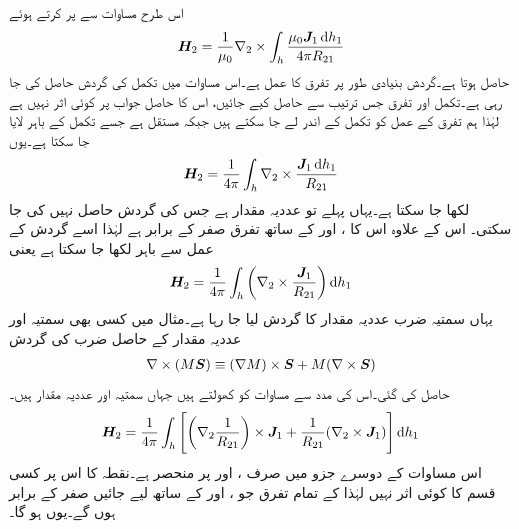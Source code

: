 اس طرح مساوات  سے  پر کرتے ہوئے
\begin{align*}
\kvec{H}_2=\frac{1}{\mu_0} \nabla_2 \times \int_h \frac{\mu_0 \kvec{J}_1 \dif h_1}{4\pi R_{21}}
\end{align*}
حاصل ہوتا ہے۔گردش  بنیادی طور پر تفرق کا عمل ہے۔اس مساوات میں تکمل کی گردش حاصل کی جا رہی ہے۔تکمل اور تفرق جس ترتیب سے حاصل کیے جائیں، اس کا حاصل جواب پر کوئی اثر نہیں ہے لہٰذا ہم تفرق کے عمل کو تکمل کے اندر لے جا سکتے ہیں جبکہ  مستقل ہے جسے تکمل کے باہر لایا جا سکتا ہے۔یوں
\begin{align*}
\kvec{H}_2=\frac{1}{4\pi}  \int_h \nabla_2 \times\frac{ \kvec{J}_1 \dif h_1}{ R_{21}}
\end{align*}
لکھا جا سکتا ہے۔یہاں  پہلے تو عددیہ مقدار ہے جس کی گردش حاصل نہیں کی جا سکتی۔ اس کے علاوہ اس کا ،  اور  کے ساتھ تفرق صفر کے برابر ہے لہٰذا اسے گردش کے عمل سے  باہر لکھا جا سکتا ہے یعنی
\begin{align}\label{مساوات_مقناطیسی_گردش_ثبوت_الف}
\kvec{H}_2=\frac{1}{4\pi}  \int_h \left(\nabla_2 \times\frac{ \kvec{J}_1}{ R_{21}}\right) \dif h_1
\end{align}
یہاں سمتیہ  ضرب عددیہ مقدار  کا گردش لیا جا رہا ہے۔مثال  میں کسی بھی سمتیہ  اور عددیہ مقدار  کے حاصل ضرب کی گردش
\begin{align}
\nabla \times (M {{\boldsymbol{S}}}) \equiv (\nabla M) \times {\ensuremath{{\boldsymbol{S}}}} +M(\nabla \times {\ensuremath{{\boldsymbol{S}}}})
\end{align}
حاصل کی گئی۔اس کی مدد سے مساوات  کو کھولتے ہیں جہاں سمتیہ  اور عددیہ مقدار  ہیں۔
\begin{align}\label{مساوات_مقناطیسی_گردش_ثبوت_ب}
\kvec{H}_2=\frac{1}{4\pi}  \int_h  \left[ \left(\nabla_2 \frac{1}{R_{21}}\right) \times \kvec{J}_1 +\frac{1}{R_{21}} (\nabla_2 \times \kvec{J}_1) \right]\dif h_1
\end{align}
اس مساوات کے دوسرے جزو میں  صرف ،  اور  پر منحصر ہے۔نقطہ  کا اس پر کسی قسم  کا کوئی اثر نہیں لہٰذا  کے تمام تفرق جو ،  اور  کے ساتھ لیے جائیں صفر کے برابر ہوں گے۔یوں  ہو گا۔

